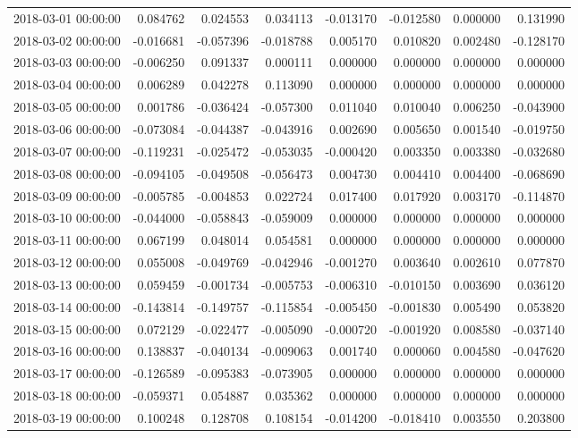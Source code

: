 \begin{tabular}{lrrrrrrr}
2018-03-01 00:00:00 & 0.084762 & 0.024553 & 0.034113 & -0.013170 & -0.012580 & 0.000000 & 0.131990 \\
2018-03-02 00:00:00 & -0.016681 & -0.057396 & -0.018788 & 0.005170 & 0.010820 & 0.002480 & -0.128170 \\
2018-03-03 00:00:00 & -0.006250 & 0.091337 & 0.000111 & 0.000000 & 0.000000 & 0.000000 & 0.000000 \\
2018-03-04 00:00:00 & 0.006289 & 0.042278 & 0.113090 & 0.000000 & 0.000000 & 0.000000 & 0.000000 \\
2018-03-05 00:00:00 & 0.001786 & -0.036424 & -0.057300 & 0.011040 & 0.010040 & 0.006250 & -0.043900 \\
2018-03-06 00:00:00 & -0.073084 & -0.044387 & -0.043916 & 0.002690 & 0.005650 & 0.001540 & -0.019750 \\
2018-03-07 00:00:00 & -0.119231 & -0.025472 & -0.053035 & -0.000420 & 0.003350 & 0.003380 & -0.032680 \\
2018-03-08 00:00:00 & -0.094105 & -0.049508 & -0.056473 & 0.004730 & 0.004410 & 0.004400 & -0.068690 \\
2018-03-09 00:00:00 & -0.005785 & -0.004853 & 0.022724 & 0.017400 & 0.017920 & 0.003170 & -0.114870 \\
2018-03-10 00:00:00 & -0.044000 & -0.058843 & -0.059009 & 0.000000 & 0.000000 & 0.000000 & 0.000000 \\
2018-03-11 00:00:00 & 0.067199 & 0.048014 & 0.054581 & 0.000000 & 0.000000 & 0.000000 & 0.000000 \\
2018-03-12 00:00:00 & 0.055008 & -0.049769 & -0.042946 & -0.001270 & 0.003640 & 0.002610 & 0.077870 \\
2018-03-13 00:00:00 & 0.059459 & -0.001734 & -0.005753 & -0.006310 & -0.010150 & 0.003690 & 0.036120 \\
2018-03-14 00:00:00 & -0.143814 & -0.149757 & -0.115854 & -0.005450 & -0.001830 & 0.005490 & 0.053820 \\
2018-03-15 00:00:00 & 0.072129 & -0.022477 & -0.005090 & -0.000720 & -0.001920 & 0.008580 & -0.037140 \\
2018-03-16 00:00:00 & 0.138837 & -0.040134 & -0.009063 & 0.001740 & 0.000060 & 0.004580 & -0.047620 \\
2018-03-17 00:00:00 & -0.126589 & -0.095383 & -0.073905 & 0.000000 & 0.000000 & 0.000000 & 0.000000 \\
2018-03-18 00:00:00 & -0.059371 & 0.054887 & 0.035362 & 0.000000 & 0.000000 & 0.000000 & 0.000000 \\
2018-03-19 00:00:00 & 0.100248 & 0.128708 & 0.108154 & -0.014200 & -0.018410 & 0.003550 & 0.203800 \\

\end{tabular}
